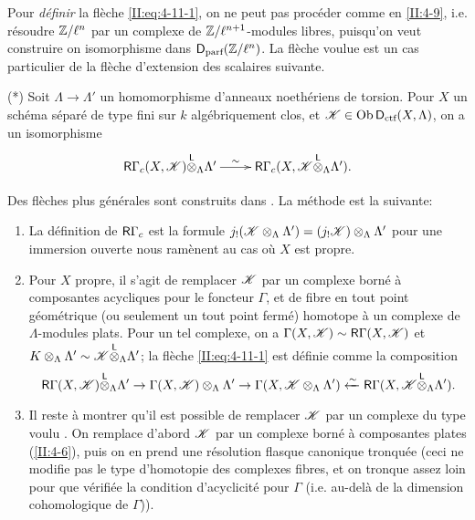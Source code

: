 Pour \emph{d\'efinir} la fl\`eche \eqref{II:eq:4-11-1}, on ne peut pas 
proc\'eder comme en \ref{II:4-9}, i.e. r\'esoudre $\mathbb{Z}/\ell^n$ par un complexe 
de $\mathbb{Z}/\ell^{n+1}$-modules libres, puisqu'on veut construire on isomorphisme 
dans $\mathsf{D}_\text{parf}(\mathbb{Z}/\ell^n)$. La fl\`eche voulue est un cas particulier de 
la fl\`eche d'extension des scalaires suivante. 

(*) Soit $\Lambda\to\Lambda'$ un homomorphisme d'anneaux noeth\'eriens de 
torsion. Pour $X$ un sch\'ema s\'epar\'e de type fini sur $k$ alg\'ebriquement 
clos, et $\mathscr{K}\in\operatorname{Ob}\mathsf{D}_\text{ctf}(X,\Lambda)$, on a un isomorphisme 
\[\xymatrix{
  \R\Gamma_c(X,\cK)\lotimes_\Lambda \Lambda' \ar[r]^-\sim & \R \Gamma_c(X,\cK\lotimes_\Lambda \Lambda') \text{.}
}\]

Des fl\`eches plus g\'en\'erales sont construits dans \cite[XVII 4.2.12]{sga4}. La 
m\'
ethode est la suivante: 
\begin{enumerate}[\indent a)]
  \item La d\'efinition de $\mathsf{R}\Gamma_c$ est la formule 
    $j_!(\mathscr{K}\otimes_\Lambda\Lambda') = (j_! \mathscr{K})\otimes_\Lambda\Lambda'$ pour une 
    immersion ouverte nous ram\`enent au cas o\`u $X$ est propre. 
  \item Pour $X$ propre, il s'agit de remplacer $\mathscr{K}$ par un complexe born\'e \`a 
    composantes acycliques pour le foncteur $\Gamma$, et de fibre en tout point 
    g\'eom\'etrique (ou seulement un tout point ferm\'e) homotope \`a un 
    complexe de $\Lambda$-modules plats. Pour un tel complexe, on a 
    $\Gamma(X,\mathscr{K})\sim \mathsf{R}\Gamma(X,\mathscr{K})$ et 
    $K\otimes_\Lambda\Lambda'\sim \mathscr{K}{\overset{\mathsf{L}}{\otimes}}_\Lambda\Lambda'$; la fl\`eche 
    \eqref{II:eq:4-11-1} est d\'efinie comme la composition 
    \[
      \mathsf{R}\Gamma(X,\mathscr{K}){\overset{\mathsf{L}}{\otimes}}_\Lambda \Lambda' \to \Gamma(X,\mathscr{K})\otimes_\Lambda\Lambda' \to \Gamma(X,\mathscr{K}\otimes_\Lambda\Lambda') \xleftarrow\sim \mathsf{R}\Gamma(X,\mathscr{K}{\overset{\mathsf{L}}{\otimes}}_\Lambda\Lambda') \text{.}
    \]
  \item Il reste \`a montrer qu'il est possible de remplacer $\mathscr{K}$ par un 
    complexe du type voulu \cite[XVII.4.2.10]{sga4}. On remplace d'abord $\mathscr{K}$ par 
    un complexe born\'e \`a composantes plates (\ref{II:4-6}), puis on en prend 
    une r\'esolution flasque canonique tronqu\'ee (ceci ne modifie pas le type 
    d'homotopie des complexes fibres, et on tronque assez loin pour que 
    v\'erifi\'ee la condition d'acyclicit\'e pour $\Gamma$ (i.e. au-del\`a 
    de la dimension cohomologique de $\Gamma$)). 
\end{enumerate}





